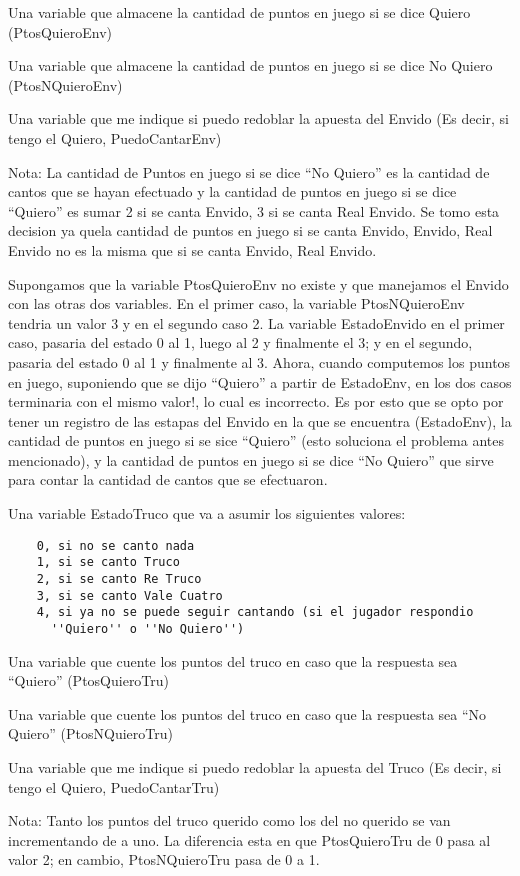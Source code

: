 Una variable que almacene la cantidad de puntos en juego si se dice Quiero (PtosQuieroEnv)

Una variable que almacene la cantidad de puntos en juego si se dice No Quiero (PtosNQuieroEnv)

Una variable que me indique si puedo redoblar la apuesta del Envido (Es decir, si tengo el Quiero, PuedoCantarEnv)

Nota: La cantidad de Puntos en juego si se dice ``No Quiero'' es la cantidad de cantos que se hayan efectuado y la cantidad de puntos en juego si se dice ``Quiero'' es sumar 2 si se canta Envido, 3 si se canta Real Envido. Se tomo esta decision ya quela cantidad de puntos en juego si se canta Envido, Envido, Real Envido no es la misma que si se canta Envido, Real Envido.

Supongamos que la variable PtosQuieroEnv no existe y que manejamos el Envido con las otras dos variables. En el primer caso, la variable PtosNQuieroEnv tendria un valor 3 y en el segundo caso 2. La variable EstadoEnvido en el primer caso, pasaria del estado 0 al 1, luego al 2 y finalmente el 3; y en el segundo, pasaria del estado 0 al 1 y finalmente al 3. Ahora, cuando computemos los puntos en juego, suponiendo que se dijo ``Quiero'' a partir de EstadoEnv, en los dos casos terminaria con el mismo valor!, lo cual es incorrecto. Es por esto que se opto por tener un registro de las estapas del Envido en la que se encuentra (EstadoEnv), la cantidad de puntos en juego si se sice ``Quiero'' (esto soluciona el problema antes mencionado), y la cantidad de puntos en juego si se dice ``No Quiero'' que sirve para contar la cantidad de cantos que se efectuaron.


Una variable EstadoTruco que va a asumir los siguientes valores:
\begin{verbatim}
    0, si no se canto nada
    1, si se canto Truco
    2, si se canto Re Truco
    3, si se canto Vale Cuatro
    4, si ya no se puede seguir cantando (si el jugador respondio
      ''Quiero'' o ''No Quiero'')
\end{verbatim}

Una variable que cuente los puntos del truco en caso que la respuesta sea ``Quiero'' (PtosQuieroTru)

Una variable que cuente los puntos del truco en caso que la respuesta sea ``No Quiero'' (PtosNQuieroTru)

Una variable que me indique si puedo redoblar la apuesta del Truco (Es decir, si tengo el Quiero, PuedoCantarTru)

Nota: Tanto los puntos del truco querido como los del no querido se van incrementando de a uno. La diferencia esta en que PtosQuieroTru de 0 pasa al valor 2; en cambio, PtosNQuieroTru pasa de 0 a 1.
